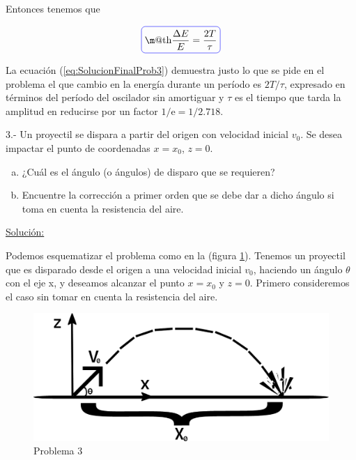 \documentclass[a4paper,10pt]{article}
\makeatletter
\newcommand*{\boxcolor}{blue}
\renewcommand{\boxed}[1]{\textcolor{\boxcolor}{%
\tikz[baseline={([yshift=-1ex]current bounding box.center)}] \node [rectangle, minimum width=1ex,rounded corners,draw] {\normalcolor\m@th$\displaystyle#1$};}}
\newcommand{\euler}{\mathrm{e}}
\makeatother
\begin{document}
Entonces tenemos que 

\begin{equation}
 \boxed{\frac{\Delta E}{E} = \frac{2T}{\tau}}
 \label{eq:SolucionFinalProb3}
\end{equation}

La ecuación (\ref{eq:SolucionFinalProb3}) demuestra justo lo que se pide en el problema
el que cambio en la energía durante un período es $2T/\tau$, expresado en términos del
período del oscilador sin amortiguar y $\tau$ es el tiempo que tarda la amplitud en reducirse
por un factor $1/\euler = 1 / 2.718$.











\vspace{.3cm}

3.- Un proyectil se dispara a partir del origen con velocidad inicial $v_{0}$.
Se desea impactar el punto de coordenadas $x=x_{0}$, $z=0$.

\begin{enumerate}[a)]
 \item ¿Cuál es el ángulo (o ángulos) de disparo que se requieren?
 \item Encuentre la corrección a primer orden que se debe dar a dicho ángulo si toma 
 en cuenta la resistencia del aire.
\end{enumerate}
\vspace{.3cm}

\underline{Solución:}

\vspace{.3cm}

Podemos esquematizar el problema como en la (figura \ref{fig:problema3}). 
Tenemos un proyectil que es disparado desde el origen a una velocidad 
inicial $v_0$, haciendo un ángulo $\theta$ con el eje x, y deseamos
alcanzar el punto $x=x_0$ y $z=0$. Primero consideremos el caso sin
tomar en cuenta la resistencia del aire.

\begin{figure}[ht]
 \centering
\includegraphics[scale=0.3]{problema3fig1}
\caption{Problema 3}
\label{fig:problema3}
\end{figure}
\end{document}
